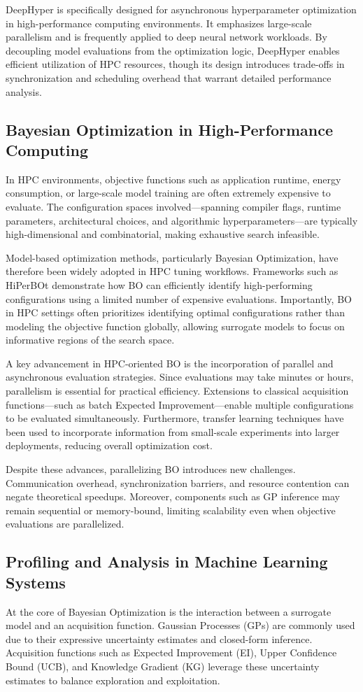 \documentclass[11pt]{article}
\begin{document}
DeepHyper is specifically designed for asynchronous hyperparameter optimization in high-performance computing environments. It emphasizes large-scale parallelism and is frequently applied to deep neural network workloads. By decoupling model evaluations from the optimization logic, DeepHyper enables efficient utilization of HPC resources, though its design introduces trade-offs in synchronization and scheduling overhead that warrant detailed performance analysis.
\subsection{Bayesian Optimization in High-Performance Computing}
In HPC environments, objective functions such as application runtime, energy consumption, or large-scale model training are often extremely expensive to evaluate. The configuration spaces involved—spanning compiler flags, runtime parameters, architectural choices, and algorithmic hyperparameters—are typically high-dimensional and combinatorial, making exhaustive search infeasible.

Model-based optimization methods, particularly Bayesian Optimization, have therefore been widely adopted in HPC tuning workflows. Frameworks such as HiPerBOt demonstrate how BO can efficiently identify high-performing configurations using a limited number of expensive evaluations. Importantly, BO in HPC settings often prioritizes identifying optimal configurations rather than modeling the objective function globally, allowing surrogate models to focus on informative regions of the search space.

A key advancement in HPC-oriented BO is the incorporation of parallel and asynchronous evaluation strategies. Since evaluations may take minutes or hours, parallelism is essential for practical efficiency. Extensions to classical acquisition functions—such as batch Expected Improvement—enable multiple configurations to be evaluated simultaneously. Furthermore, transfer learning techniques have been used to incorporate information from small-scale experiments into larger deployments, reducing overall optimization cost.

Despite these advances, parallelizing BO introduces new challenges. Communication overhead, synchronization barriers, and resource contention can negate theoretical speedups. Moreover, components such as GP inference may remain sequential or memory-bound, limiting scalability even when objective evaluations are parallelized.

\subsection{Profiling and Analysis in Machine Learning Systems}
At the core of Bayesian Optimization is the interaction between a surrogate model and an acquisition function. Gaussian Processes (GPs) are commonly used due to their expressive uncertainty estimates and closed-form inference. Acquisition functions such as Expected Improvement (EI), Upper Confidence Bound (UCB), and Knowledge Gradient (KG) leverage these uncertainty estimates to balance exploration and exploitation.
\end{document}
